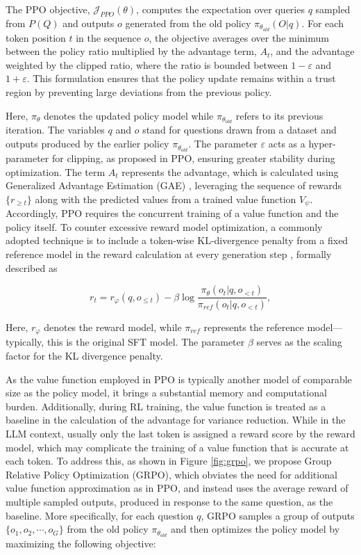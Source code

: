 \begin{itemize}[topsep=0pt]
\begin{itemize}[topsep=0pt]
The PPO objective, $\mathcal{J}_{PPO}(\theta)$, computes the expectation over queries $q$ sampled from $P(Q)$ and outputs $o$ generated from the old policy $\pi_{\theta_{old}}(O|q)$. For each token position $t$ in the sequence $o$, the objective averages over the minimum between the policy ratio multiplied by the advantage term, $A_{t}$, and the advantage weighted by the clipped ratio, where the ratio is bounded between $1 - \varepsilon$ and $1 + \varepsilon$. This formulation ensures that the policy update remains within a trust region by preventing large deviations from the previous policy.

Here, $\pi_{\theta}$ denotes the updated policy model while $\pi_{\theta_{old}}$ refers to its previous iteration. The variables $q$ and $o$ stand for questions drawn from a dataset and outputs produced by the earlier policy $\pi_{\theta_{old}}$. The parameter $\varepsilon$ acts as a hyper-parameter for clipping, as proposed in PPO, ensuring greater stability during optimization. The term $A_t$ represents the advantage, which is calculated using Generalized Advantage Estimation (GAE) \citep{gae}, leveraging the sequence of rewards $\{r_{\ge t}\}$ along with the predicted values from a trained value function $V_{\psi}$. Accordingly, PPO requires the concurrent training of a value function and the policy itself. To counter excessive reward model optimization, a commonly adopted technique is to include a token-wise KL-divergence penalty from a fixed reference model in the reward calculation at every generation step \citep{ouyang2022training}, formally described as

\begin{equation}
    r_{t} = r_\varphi(q, o_{\le t}) - \beta \log\frac{\pi_{\theta}(o_{t}|q, o_{<t})}{\pi_{ref}(o_{t}|q, o_{<t})},
\label{eq:PPO-reward}
\end{equation}

Here, $r_\varphi$ denotes the reward model, while $\pi_{ref}$ represents the reference model—typically, this is the original SFT model. The parameter $\beta$ serves as the scaling factor for the KL divergence penalty.

As the value function employed in PPO is typically another model of comparable size as the policy model, it brings a substantial memory and computational burden. Additionally, during RL training, the value function is treated as a baseline in the calculation of the advantage for variance reduction. While in the LLM context, usually only the last token is assigned a reward score by the reward model, which may complicate the training of a value function that is accurate at each token. To address this, as shown in Figure \ref{fig:grpo}, we propose Group Relative Policy Optimization (GRPO), which obviates the need for additional value function approximation as in PPO, and instead uses the average reward of multiple sampled outputs, produced in response to the same question, as the baseline. More specifically, for each question $q$, GRPO samples a group of outputs $\{o_1, o_2, \cdots, o_G\}$  from the old policy  $\pi_{\theta_{old}}$  and then optimizes the policy model by maximizing the following objective:


\end{itemize}
\end{itemize}

